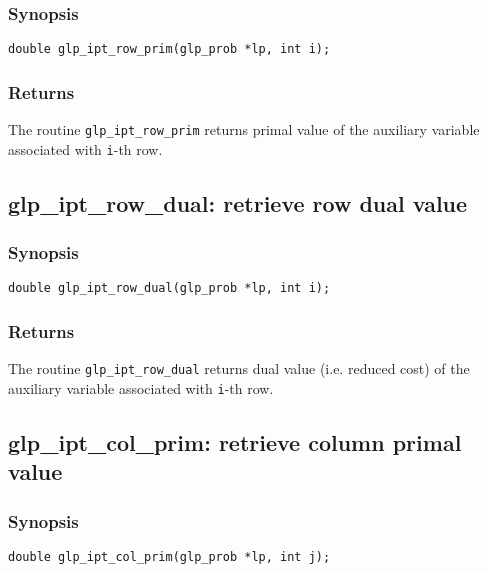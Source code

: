 \subsubsection*{Synopsis}

\begin{verbatim}
double glp_ipt_row_prim(glp_prob *lp, int i);
\end{verbatim}

\subsubsection*{Returns}

The routine \verb|glp_ipt_row_prim| returns primal value of the
auxiliary variable associated with \verb|i|-th row.

\newpage

\subsection{glp\_ipt\_row\_dual: retrieve row dual value}

\subsubsection*{Synopsis}

\begin{verbatim}
double glp_ipt_row_dual(glp_prob *lp, int i);
\end{verbatim}

\subsubsection*{Returns}

The routine \verb|glp_ipt_row_dual| returns dual value (i.e. reduced
cost) of the auxiliary variable associated with \verb|i|-th row.

\subsection{glp\_ipt\_col\_prim: retrieve column primal value}

\subsubsection*{Synopsis}

\begin{verbatim}
double glp_ipt_col_prim(glp_prob *lp, int j);
\end{verbatim}

